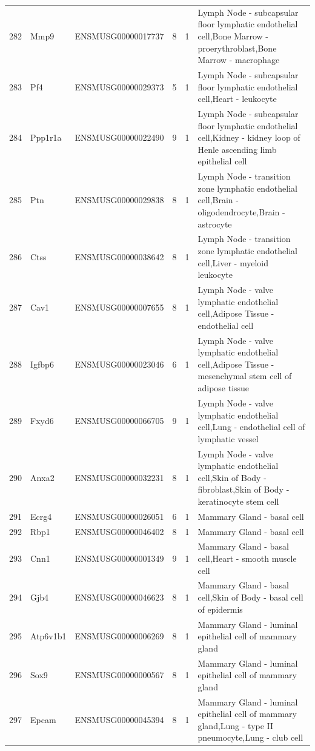 \begin{table}[ht]
{\begin{tabular}{lllrrl}
        282 & Mmp9 & ENSMUSG00000017737 & 8 & 1 & Lymph Node - subcapsular floor lymphatic endothelial cell,Bone Marrow - proerythroblast,Bone Marrow - macrophage \\
        283 & Pf4 & ENSMUSG00000029373 & 5 & 1 & Lymph Node - subcapsular floor lymphatic endothelial cell,Heart - leukocyte \\
        284 & Ppp1r1a & ENSMUSG00000022490 & 9 & 1 & Lymph Node - subcapsular floor lymphatic endothelial cell,Kidney - kidney loop of Henle ascending limb epithelial cell \\
        285 & Ptn & ENSMUSG00000029838 & 8 & 1 & Lymph Node - transition zone lymphatic endothelial cell,Brain - oligodendrocyte,Brain - astrocyte \\
        286 & Ctss & ENSMUSG00000038642 & 8 & 1 & Lymph Node - transition zone lymphatic endothelial cell,Liver - myeloid leukocyte \\
        287 & Cav1 & ENSMUSG00000007655 & 8 & 1 & Lymph Node - valve lymphatic endothelial cell,Adipose Tissue - endothelial cell \\
        288 & Igfbp6 & ENSMUSG00000023046 & 6 & 1 & Lymph Node - valve lymphatic endothelial cell,Adipose Tissue - mesenchymal stem cell of adipose tissue \\
        289 & Fxyd6 & ENSMUSG00000066705 & 9 & 1 & Lymph Node - valve lymphatic endothelial cell,Lung - endothelial cell of lymphatic vessel \\
        290 & Anxa2 & ENSMUSG00000032231 & 8 & 1 & Lymph Node - valve lymphatic endothelial cell,Skin of Body - fibroblast,Skin of Body - keratinocyte stem cell \\
        291 & Ecrg4 & ENSMUSG00000026051 & 6 & 1 & Mammary Gland - basal cell \\
        292 & Rbp1 & ENSMUSG00000046402 & 8 & 1 & Mammary Gland - basal cell \\
        293 & Cnn1 & ENSMUSG00000001349 & 9 & 1 & Mammary Gland - basal cell,Heart - smooth muscle cell \\
        294 & Gjb4 & ENSMUSG00000046623 & 8 & 1 & Mammary Gland - basal cell,Skin of Body - basal cell of epidermis \\
        295 & Atp6v1b1 & ENSMUSG00000006269 & 8 & 1 & Mammary Gland - luminal epithelial cell of mammary gland \\
        296 & Sox9 & ENSMUSG00000000567 & 8 & 1 & Mammary Gland - luminal epithelial cell of mammary gland \\
        297 & Epcam & ENSMUSG00000045394 & 8 & 1 & Mammary Gland - luminal epithelial cell of mammary gland,Lung - type II pneumocyte,Lung - club cell \\

\end{tabular}}
\end{table}
